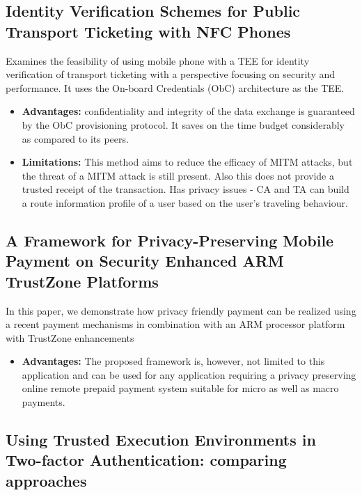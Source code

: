 \documentclass[conference]{IEEEtran}
\begin{document}
\subsection{Identity Verification Schemes for Public Transport Ticketing with NFC Phones}
Examines the feasibility of using mobile phone with a TEE for identity verification of transport ticketing with a perspective focusing on security and performance. It uses the On-board Credentials (ObC) architecture as the TEE.
\begin{itemize}
    \item \textbf{Advantages:}  confidentiality and integrity of the data exchange is guaranteed by the ObC provisioning protocol. It saves on the time budget considerably as compared to its peers.
    \item \textbf{Limitations:} This method aims to reduce the efficacy of MITM attacks, but the threat of a MITM attack is still present. Also this does not provide a trusted receipt of the transaction. Has privacy issues - CA and TA can build a route information profile of a user based on the user’s traveling behaviour.
\end{itemize}


\subsection{A Framework for Privacy-Preserving Mobile Payment on Security Enhanced ARM TrustZone Platforms}
In this paper, we demonstrate how privacy friendly payment can be realized using a recent payment mechanisms in combination with an ARM processor platform with TrustZone enhancements
\begin{itemize}
    \item \textbf{Advantages:}  The proposed framework is, however, not limited to this application and can be used for any application requiring a privacy preserving online remote prepaid payment system suitable for micro as well as macro payments.
\end{itemize}


\subsection{Using Trusted Execution Environments in Two-factor Authentication: comparing approaches}
\end{document}
